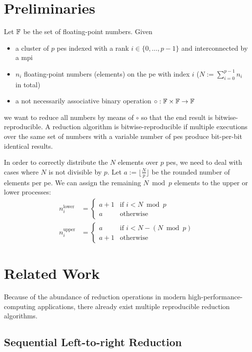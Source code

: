 \section{Preliminaries}
\label{sec:Preliminaries}
Let $\mathbb{F}$ be the set of floating-point numbers. Given
\begin{itemize}
\item a cluster of $p$ \glspl{pe} indexed with a rank $i \in \{0, \ldots, p - 1\}$ and interconnected by a \gls{mpi}
\item $n_i$ floating-point numbers (elements) on the \gls{pe} with index $i$ ($N := \sum_{i=0}^{p-1} n_i$ in total)
\item a not necessarily associative binary operation $\circ: \mathbb{F} \times \mathbb{F} \rightarrow \mathbb{F}$
\end{itemize}
we want to reduce all numbers by means of $\circ$ so that the end result is bitwise-reproducible.
A reduction algorithm is bitwise-reproducible if multiple executions over the same set of numbers with a variable number of \glspl{pe} produce bit-per-bit identical results.

In order to correctly distribute the $N$ elements over $p$ \glspl{pe}, we need to deal with cases where $N$ is not divisible by $p$.
Let $a := \lfloor \tfrac{N}{p} \rfloor$ be the rounded number of elements per \gls{pe}.
We can assign the remaining $N \bmod p$ elements to the upper or lower processes:
\begin{align}
\label{eq:lowerDistribution}
n_i^{\textrm{lower}} &= \begin{cases}
    a + 1 & \textrm{if } i < N \bmod p \\
    a & \textrm{otherwise}
\end{cases} \\
\label{eq:upperDistribution}
n_i^{\textrm{upper}} &= \begin{cases}
    a & \textrm{if } i < N - (N \bmod p) \\
    a + 1 & \textrm{otherwise}
\end{cases}
\end{align}

\section{Related Work}
\label{sec:RelatedWork}
Because of the abundance of reduction operations in modern high-performance-computing applications, there already exist multiple reproducible reduction algorithms.


\subsection{Sequential Left-to-right Reduction}
\label{sec:SequentialLeftToRightReduction}

